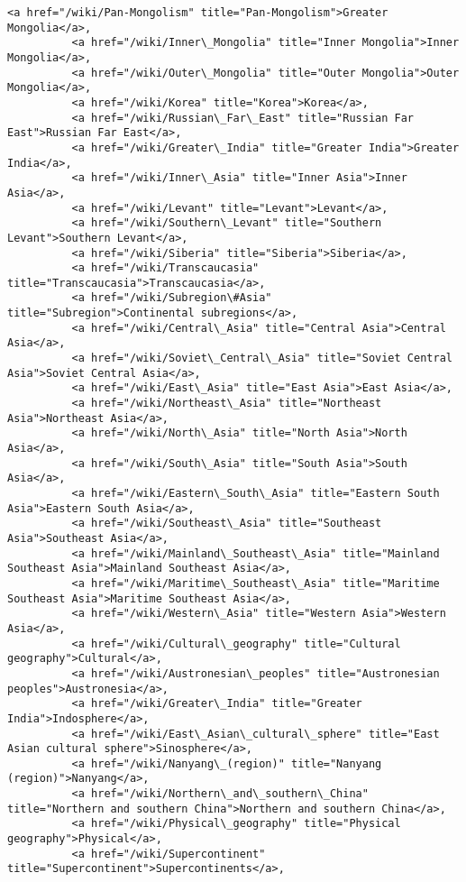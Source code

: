 \documentclass[11pt]{article}
\begin{document}
\begin{Verbatim}[commandchars=\\\{\}]
          <a href="/wiki/Pan-Mongolism" title="Pan-Mongolism">Greater Mongolia</a>,
          <a href="/wiki/Inner\_Mongolia" title="Inner Mongolia">Inner Mongolia</a>,
          <a href="/wiki/Outer\_Mongolia" title="Outer Mongolia">Outer Mongolia</a>,
          <a href="/wiki/Korea" title="Korea">Korea</a>,
          <a href="/wiki/Russian\_Far\_East" title="Russian Far East">Russian Far East</a>,
          <a href="/wiki/Greater\_India" title="Greater India">Greater India</a>,
          <a href="/wiki/Inner\_Asia" title="Inner Asia">Inner Asia</a>,
          <a href="/wiki/Levant" title="Levant">Levant</a>,
          <a href="/wiki/Southern\_Levant" title="Southern Levant">Southern Levant</a>,
          <a href="/wiki/Siberia" title="Siberia">Siberia</a>,
          <a href="/wiki/Transcaucasia" title="Transcaucasia">Transcaucasia</a>,
          <a href="/wiki/Subregion\#Asia" title="Subregion">Continental subregions</a>,
          <a href="/wiki/Central\_Asia" title="Central Asia">Central Asia</a>,
          <a href="/wiki/Soviet\_Central\_Asia" title="Soviet Central Asia">Soviet Central Asia</a>,
          <a href="/wiki/East\_Asia" title="East Asia">East Asia</a>,
          <a href="/wiki/Northeast\_Asia" title="Northeast Asia">Northeast Asia</a>,
          <a href="/wiki/North\_Asia" title="North Asia">North Asia</a>,
          <a href="/wiki/South\_Asia" title="South Asia">South Asia</a>,
          <a href="/wiki/Eastern\_South\_Asia" title="Eastern South Asia">Eastern South Asia</a>,
          <a href="/wiki/Southeast\_Asia" title="Southeast Asia">Southeast Asia</a>,
          <a href="/wiki/Mainland\_Southeast\_Asia" title="Mainland Southeast Asia">Mainland Southeast Asia</a>,
          <a href="/wiki/Maritime\_Southeast\_Asia" title="Maritime Southeast Asia">Maritime Southeast Asia</a>,
          <a href="/wiki/Western\_Asia" title="Western Asia">Western Asia</a>,
          <a href="/wiki/Cultural\_geography" title="Cultural geography">Cultural</a>,
          <a href="/wiki/Austronesian\_peoples" title="Austronesian peoples">Austronesia</a>,
          <a href="/wiki/Greater\_India" title="Greater India">Indosphere</a>,
          <a href="/wiki/East\_Asian\_cultural\_sphere" title="East Asian cultural sphere">Sinosphere</a>,
          <a href="/wiki/Nanyang\_(region)" title="Nanyang (region)">Nanyang</a>,
          <a href="/wiki/Northern\_and\_southern\_China" title="Northern and southern China">Northern and southern China</a>,
          <a href="/wiki/Physical\_geography" title="Physical geography">Physical</a>,
          <a href="/wiki/Supercontinent" title="Supercontinent">Supercontinents</a>,

\end{Verbatim}
\end{document}
